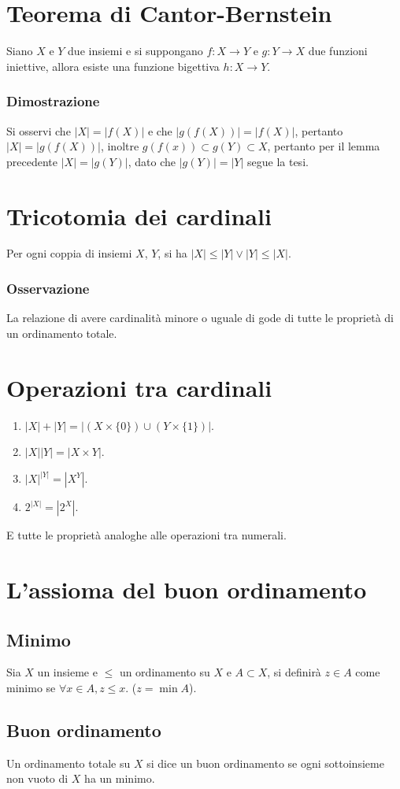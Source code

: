 \section{Teorema di Cantor-Bernstein}
Siano $X$ e $Y$ due insiemi e si suppongano $f:X\rightarrow Y$ e $g:Y\rightarrow X$ due funzioni iniettive, allora esiste una funzione bigettiva $h:X\rightarrow Y$.
\subsubsection{Dimostrazione}
Si osservi che $|X|=|f(X)|$ e che $|g(f(X))|=|f(X)|$, pertanto $|X|=|g(f(X))|$, inoltre $g(f(x))\subset g(Y)\subset X$, pertanto per il lemma precedente $|X|=|g(Y)|$, dato che
$|g(Y)|=|Y|$ segue la tesi. 
\section{Tricotomia dei cardinali}
Per ogni coppia di insiemi $X$, $Y$, si ha $|X|\le|Y|\lor|Y|\le|X|$.
\subsubsection{Osservazione}
La relazione di avere cardinalit\`a minore o uguale di gode di tutte le propriet\`a di un ordinamento totale.
\section{Operazioni tra cardinali}
\begin{enumerate}
\item $|X|+|Y|=|(X\times\{0\})\cup(Y\times\{1\})|$.
\item $|X||Y|=|X\times Y|$.
\item $|X|^{|Y|}=|X^Y|$.
\item $2^{|X|}=|2^X|$.
\end{enumerate}
E tutte le propriet\`a analoghe alle operazioni tra numerali.
\section{L'assioma del buon ordinamento}
\subsection{Minimo}
Sia $X$ un insieme e $\le$ un ordinamento su $X$ e $A\subset X$, si definir\`a $z\in A$ come minimo se $\forall x\in A, z\le x$. ($z=\min A$).
\subsection{Buon ordinamento}
Un ordinamento totale su $X$ si dice un buon ordinamento se ogni sottoinsieme non vuoto di $X$ ha un minimo.
